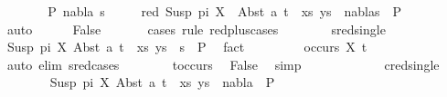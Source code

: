 \begin{isabellebody}
\ \ \ \ \isamarkupfalse%
\ \isamarkupfalse%
\ P{}\ nabla\ s\ \isanewline
\ \ \ \ red{\isacharcolon}{\kern0pt}\ {\isachardoublequoteopen}{\isacharparenleft}{\kern0pt}{\isacharparenleft}{\kern0pt}Susp\ pi\ X\ {\isasymapprox}{\isacharquery}{\kern0pt}\ Abst\ a\ t{\isacharparenright}{\kern0pt}\ {\isacharhash}{\kern0pt}\ xs{\isacharcomma}{\kern0pt}\ ys{\isacharparenright}{\kern0pt}\ {\isasymTurnstile}\ {\isacharparenleft}{\kern0pt}nabla{\isacharcomma}{\kern0pt}s{\isacharparenright}{\kern0pt}\ {\isasymRightarrow}\ P{}{\isachardoublequoteclose}\isanewline
\ \ \ \ \ \ \isamarkupfalse%
\ auto\isanewline
\ \ \ \ \isamarkupfalse%
\ False\ \isanewline
\ \ \ \ \isamarkupfalse%
\ {\isacharparenleft}{\kern0pt}cases\ rule{\isacharcolon}{\kern0pt}\ red{\isacharunderscore}{\kern0pt}plus{\isachardot}{\kern0pt}cases{\isacharparenright}{\kern0pt}\isanewline
\ \ \ \ \ \ \isamarkupfalse%
\ sred{\isacharunderscore}{\kern0pt}single\isanewline
\ \ \ \ \ \ \isamarkupfalse%
\ {\isachardoublequoteopen}{\isacharparenleft}{\kern0pt}{\isacharparenleft}{\kern0pt}Susp\ pi\ X{\isacharcomma}{\kern0pt}\ Abst\ a\ t{\isacharparenright}{\kern0pt}\ {\isacharhash}{\kern0pt}\ xs{\isacharcomma}{\kern0pt}\ ys{\isacharparenright}{\kern0pt}\ {\isasymturnstile}\ s\ {\isasymleadsto}\ P{}{\isachardoublequoteclose}\ \isamarkupfalse%
\ fact\isanewline
\ \ \ \ \ \ \isamarkupfalse%
\ {\isachardoublequoteopen}{\isasymnot}\ occurs\ X\ t{\isachardoublequoteclose}\ \isanewline
\ \ \ \ \ \ \ \ \ \isamarkupfalse%
\ {\isacharparenleft}{\kern0pt}auto\ elim{\isacharcolon}{\kern0pt}\ s{\isacharunderscore}{\kern0pt}red{\isachardot}{\kern0pt}cases{\isacharparenright}{\kern0pt}\isanewline
\ \ \ \ \ \ \isamarkupfalse%
\ t{\isacharunderscore}{\kern0pt}occurs\ \isamarkupfalse%
\ False\ \isamarkupfalse%
\ simp\isanewline
\ \ \ \ \isamarkupfalse%
\isanewline
\ \ \ \ \ \ \isamarkupfalse%
\ cred{\isacharunderscore}{\kern0pt}single\isanewline
\ \ \ \ \ \ \isamarkupfalse%
\ {\isachardoublequoteopen}{\isacharparenleft}{\kern0pt}{\isacharparenleft}{\kern0pt}Susp\ pi\ X{\isacharcomma}{\kern0pt}\ Abst\ a\ t{\isacharparenright}{\kern0pt}\ {\isacharhash}{\kern0pt}\ xs{\isacharcomma}{\kern0pt}\ ys{\isacharparenright}{\kern0pt}\ {\isasymturnstile}\ nabla\ {\isasymrightarrow}\ P{}{\isachardoublequoteclose}\ \isamarkupfalse%

\end{isabellebody}
